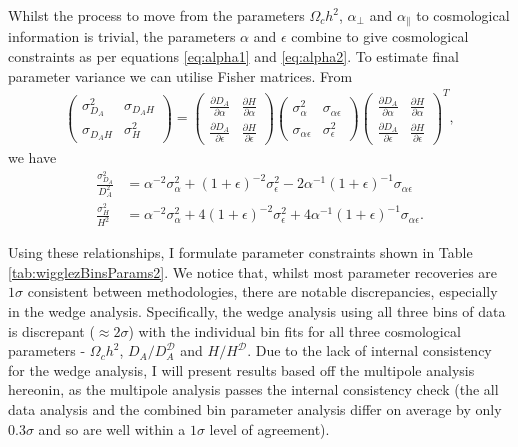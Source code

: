 \documentclass[titlesmallcaps, examinerscopy, copyrightpage]{uqthesis}
\begin{document}
Whilst the process to move from the parameters $\Omega_c h^2$, $\alpha_\perp$ and $\alpha_\parallel$ to cosmological information is trivial, the parameters $\alpha$ and $\epsilon$ combine to give cosmological constraints as per equations \eqref{eq:alpha1} and \eqref{eq:alpha2}. To estimate final parameter variance we can utilise Fisher matrices. From
\begin{align}
\begin{pmatrix}
\sigma_{D_A}^2 & \sigma_{D_A H} \\ \sigma_{D_A H} & \sigma_H^2 \end{pmatrix}
 = 
\begin{pmatrix}
\frac{\partial D_A}{\partial \alpha} & \frac{\partial H}{\partial \alpha} \\ \frac{\partial D_A}{\partial \epsilon} & \frac{\partial H}{\partial \epsilon} \end{pmatrix} 
\begin{pmatrix}
\sigma_\alpha^2 & \sigma_{\alpha \epsilon} \\ \sigma_{\alpha \epsilon} & \sigma_\epsilon^2
\end{pmatrix}
\begin{pmatrix}
\frac{\partial D_A}{\partial \alpha} & \frac{\partial H}{\partial \alpha} \\ \frac{\partial D_A}{\partial \epsilon} & \frac{\partial H}{\partial \epsilon} \end{pmatrix} ^T,
\end{align}
we have
\begin{align}
\frac{\sigma_{D_A}^2}{D_A^2} &= \alpha^{-2} \sigma_\alpha^2 + \left(1 + \epsilon \right)^{-2} \sigma_\epsilon^2 - 2\alpha^{-1}\left(1 + \epsilon \right)^{-1} \sigma_{\alpha \epsilon} \\
\frac{\sigma_H^2}{H^2} &= \alpha^{-2} \sigma_\alpha^2 + 4(1+\epsilon)^{-2} \sigma_\epsilon^2 + 4 \alpha^{-1} (1 + \epsilon)^{-1} \sigma_{\alpha \epsilon}.
\end{align}








Using these relationships, I formulate parameter constraints shown in Table \ref{tab:wigglezBinsParams2}. We notice that, whilst most parameter recoveries are $1\sigma$ consistent between methodologies, there are notable discrepancies, especially in the wedge analysis. Specifically, the wedge analysis using all three bins of data is discrepant ($\approx 2\sigma$) with the individual bin fits for all three cosmological parameters - $\Omega_c h^2$, $D_A / D_A^{\mathcal{D}}$ and $H / H^\mathcal{D}$. Due to the lack of internal consistency for the wedge analysis, I will present results based off the multipole analysis hereonin, as the multipole analysis passes the internal consistency check (the all data analysis and the combined bin parameter analysis differ on average by only $0.3\sigma$ and so are well within a $1\sigma$ level of agreement).\\
\end{document}
